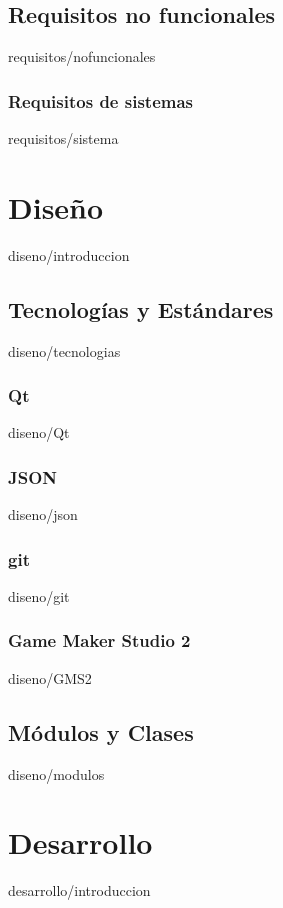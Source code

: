 \documentclass[epsbased,copyright,final,printable,covers,extendedindex,firstnumbered,tfg,gnuplot]{tfgtfmthesisuam}
\begin{document}
	\section{Requisitos no funcionales\label{SEC:REQUISITOSNOFUNCIONALES}}{requisitos/nofuncionales}
		\begin{nonfunctional}
			\subsection{Requisitos de sistemas\label{SUBSEC:REQSISTEMA}}{requisitos/sistema}
		\end{nonfunctional}
	
\chapter{Diseño\label{CAP:DISENO}}{diseno/introduccion} %
	\section{Tecnologías y Estándares\label{SEC:TECNOLOGIAS}}{diseno/tecnologias}
		\subsection{Qt\label{SUBSEC:QT}}{diseno/Qt}
		\subsection{JSON\label{SUBSEC:JSON}}{diseno/json}
		\subsection{git\label{SUBSEC:GIT}}{diseno/git}
		\subsection{Game Maker Studio 2\label{SUBSEC:GMS2}}{diseno/GMS2}
	\section{Módulos y Clases\label{SEC:MODULOS}}{diseno/modulos}

\chapter{Desarrollo\label{CAP:DESARROLLO}}{desarrollo/introduccion}
\end{document}
